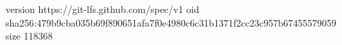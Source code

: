 version https://git-lfs.github.com/spec/v1
oid sha256:479b9cba035b69f890651afa7f0e4980c6c31b1371f2cc23c957b67455579059
size 118368
